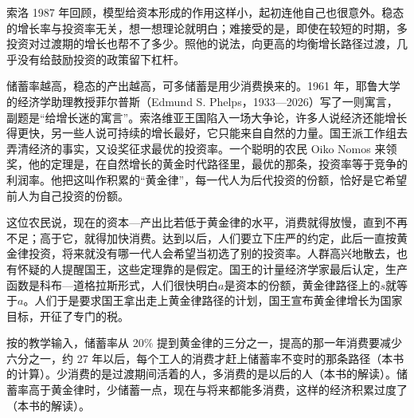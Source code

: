 
索洛 1987 年回顾，模型给资本形成的作用这样小，起初连他自己也很意外\cite{solow1987}。稳态的增长率与投资率无关，想一想理论就明白；难接受的是，即使在较短的时期，多投资对过渡期的增长也帮不了多少\cite{solow1987}。照他的说法，向更高的均衡增长路径过渡，几乎没有给鼓励投资的政策留下杠杆\cite{solow1987}。

储蓄率越高，稳态的产出越高，可多储蓄是用少消费换来的。1961 年，耶鲁大学的经济学助理教授菲尔普斯（Edmund S. Phelps，1933—2026）写了一则寓言，副题是“给增长迷的寓言”\cite{phelps1961,loc40,gnd40,nobel2006}。索洛维亚王国陷入一场大争论，许多人说经济还能增长得更快，另一些人说可持续的增长最好，它只能来自自然的力量\cite{phelps1961}。国王派工作组去弄清经济的事实，又设奖征求最优的投资率\cite{phelps1961}。一个聪明的农民 Oiko Nomos 来领奖，他的定理是，在自然增长的黄金时代路径里，最优的那条，投资率等于竞争的利润率\cite{phelps1961}。他把这叫作积累的“黄金律”，每一代人为后代投资的份额，恰好是它希望前人为自己投资的份额\cite{phelps1961}。

这位农民说，现在的资本—产出比若低于黄金律的水平，消费就得放慢，直到不再不足；高于它，就得加快消费\cite{phelps1961}。达到以后，人们要立下庄严的约定，此后一直按黄金律投资，将来就没有哪一代人会希望当初选了别的投资率\cite{phelps1961}。人群高兴地散去，也有怀疑的人提醒国王，这些定理靠的是假定\cite{phelps1961}。国王的计量经济学家最后认定，生产函数是科布—道格拉斯形式，人们很快明白$a$是资本的份额，黄金律路径上的$s$就等于$a$\cite{phelps1961}。人们于是要求国王拿出走上黄金律路径的计划，国王宣布黄金律增长为国家目标，开征了专门的税\cite{phelps1961}。

按的教学输入，储蓄率从 20\% 提到黄金律的三分之一，提高的那一年消费要减少六分之一，约 27 年以后，每个工人的消费才赶上储蓄率不变时的那条路径（本书的计算）。少消费的是过渡期间活着的人，多消费的是以后的人（本书的解读）。储蓄率高于黄金律时，少储蓄一点，现在与将来都能多消费，这样的经济积累过度了（本书的解读）。

